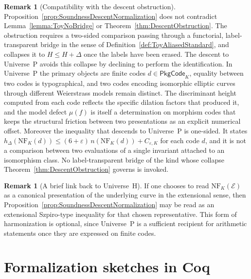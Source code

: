 \documentclass[10pt, reqno]{amsart}
\theoremstyle{plain}
\theoremstyle{definition}
\newtheorem{remark}[theorem]{Remark}
\theoremstyle{plain}
\begin{document}
\begin{remark}[Compatibility with the descent obstruction]\label{rem:SoundnessVsNoBridge}
Proposition~\ref{prop:SoundnessDescentNormalization} does not contradict Lemma~\ref{lemma:ToyNoBridge} or Theorem~\ref{thm:DescentObstruction}. The obstruction requires a two-sided comparison passing through a functorial, label-transparent bridge in the sense of Definition~\ref{def:ToyAliasedStandard}, and collapses it to $H \le H + \Delta$ once the labels have been erased. The descent to Universe~P avoids this collapse by declining to perform the identification. In Universe~P the primary objects are finite codes $d \in \mathsf{PkgCode}_K$, equality between two codes is typographical, and two codes encoding isomorphic elliptic curves through different Weierstrass models remain distinct. The discriminant height computed from each code reflects the specific dilation factors that produced it, and the model defect $\mu(f)$ is itself a determination on morphism codes that keeps the structural friction between two presentations as an explicit numerical offset. Moreover the inequality that descends to Universe~P is one-sided. It states $h_{\Delta}(\mathrm{NF}_K(d)) \le (6+\varepsilon)\,n(\mathrm{NF}_K(d)) + C_{\varepsilon,K}$ for each code $d$, and it is not a comparison between two evaluations of a single invariant attached to an isomorphism class. No label-transparent bridge of the kind whose collapse Theorem~\ref{thm:DescentObstruction} governs is invoked.
\end{remark}

\begin{remark}[A brief link back to Universe~H]\label{rem:LinkBackToH}
If one chooses to read $\mathrm{NF}_K(\mathcal{E})$ as a canonical presentation of the underlying curve in the extensional sense, then Proposition~\ref{prop:SoundnessDescentNormalization} may be read as an extensional Szpiro-type inequality for that chosen representative. This form of harmonization is optional, since Universe~P is a sufficient recipient for arithmetic statements once they are expressed on finite codes.
\end{remark}

\section{Formalization sketches in Coq}\label{sec:ToyFormalization}
\end{document}
